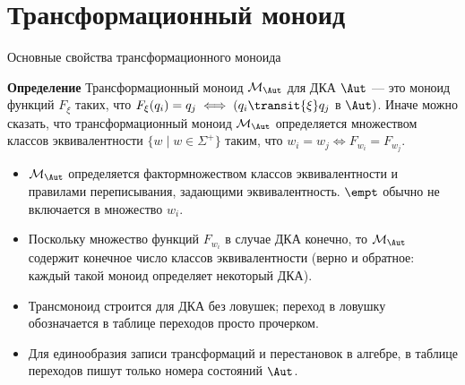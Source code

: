 \section{Трансформационный моноид} %
\begin{frame}{Основные свойства трансформационного моноида}
    \vspace*{-6pt}
    \begin{block}{\bf Определение}
        Трансформационный моноид $\mathcal{M}_{\Aut}$ для ДКА $\Aut$ --- это моноид функций $F_{\xi}$ таких, что $F_{\xi}(q_i)= q_j\iff (q_i\transit{\xi} q_j$ в $\Aut)$. Иначе можно сказать, что трансформационный моноид $\mathcal{M}_{\Aut}$ определяется множеством классов эквивалентности
        $\bigl\{w\mid w\in\Sigma^+\bigr\}$ таким, что $w_i = w_j\iff F_{w_i}=F_{w_j}$.
    \end{block} %
    \begin{itemize}
        \item $\mathcal{M}_{\Aut}$ определяется фактормножеством классов эквивалентности и правилами переписывания, задающими эквивалентность. $\empt$ обычно не включается в множество $w_i$.
        \item Поскольку множество функций $F_{w_i}$ в случае ДКА конечно, то $\mathcal{M}_{\Aut}$ содержит конечное число классов эквивалентности (верно и обратное: каждый такой моноид определяет некоторый ДКА).
        \item Трансмоноид строится для ДКА без ловушек; переход в ловушку обозначается в таблице переходов просто прочерком.
        \item Для единообразия записи трансформаций и перестановок в алгебре, в таблице переходов пишут только номера состояний $\Aut$.
    \end{itemize} %
\end{frame}

